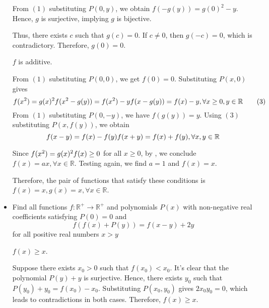 \documentclass[11pt]{scrartcl}
\begin{document}
\begin{itemize}[label=, leftmargin=0em, itemsep=0.2em]
\begin{sol}
\begin{pro}
            From $(1)$ substituting $P(0,y)$, we obtain $f(-g(y)) = g(0)^2 - y$. Hence, $g$ is surjective, implying $g$ is bijective.
        \end{pro}

        Thus, there exists $c$ such that $g(c) = 0$. If $c \neq 0$, then $g(-c) = 0$, which is contradictory. Therefore, $g(0) = 0$.

         $f$ is additive.
        \begin{pro}
            From $(1)$ substituting $P(0,0)$, we get $f(0) = 0$. Substituting $P(x,0)$ gives
            \[
                f(x^2) = g(x)^2 \ra f(x^2 - g(y)) = f(x^2) - y \ra f(x - g(y)) = f(x) - y, \forall x \geq 0, y \in \mathbb{R} \tag{3}
            \]
            From $(1)$ substituting $P(0, -y)$, we have $f(g(y)) = y$. Using $(3)$ substituting $P(x, f(y))$, we obtain
            \[
                f(x - y) = f(x) - f(y) \ra f(x + y) = f(x) + f(y), \forall x,y \in \mathbb{R}
            \]
        \end{pro}

        Since $f(x^2) = g(x)^2 \ra f(x) \geq 0$ for all $x \geq 0$, by , we conclude $f(x) = ax, \forall x \in \mathbb{R}$. Testing again, we find $a = 1$ and $f(x) = x$.

        Therefore, the pair of functions that satisfy these conditions is $\boxed{f(x) = x, g(x) = x, \forall x \in \mathbb{R}}$.

    \end{sol}

    \item \begin{bt}
        Find all functions \( f : \mathbb{R}^+ \to \mathbb{R}^+ \) and polynomials \( P(x) \) with non-negative real coefficients satisfying \( P(0) = 0 \) and \[f(f(x) + P(y)) = f(x - y) + 2y\] for all positive real numbers $x > y$
    \end{bt}
    \begin{sol}
        

         $f(x) \geq x$.
\begin{pro}
    Suppose there exists $x_0 > 0$ such that $f(x_0) < x_0$. It's clear that the polynomial $P(y) + y$ is surjective. Hence, there exists $y_0$ such that $P(y_0) + y_0 = f(x_0) - x_0$. Substituting $P(x_0,y_0)$ gives $2x_0y_0 = 0$, which leads to contradictions in both cases. Therefore, $f(x) \geq x$.
\end{pro}


\end{sol}
\end{itemize}
\end{document}

